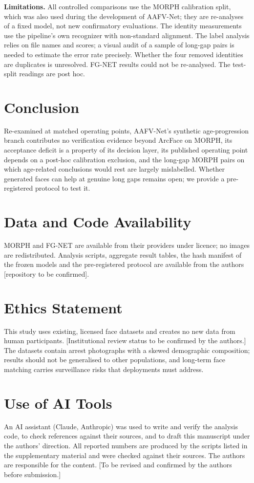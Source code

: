 \documentclass[journal]{IEEEtran}
\begin{document}
\textbf{Limitations.} All controlled comparisons use the MORPH calibration split, which was also used during the development of AAFV-Net; they are re-analyses of a fixed model, not new confirmatory evaluations. The identity measurements use the pipeline's own recognizer with non-standard alignment. The label analysis relies on file names and scores; a visual audit of a sample of long-gap pairs is needed to estimate the error rate precisely. Whether the four removed identities are duplicates is unresolved. FG-NET results could not be re-analysed. The test-split readings are post hoc.

\section{Conclusion}
Re-examined at matched operating points, AAFV-Net's synthetic age-progression branch contributes no verification evidence beyond ArcFace on MORPH, its acceptance deficit is a property of its decision layer, its published operating point depends on a post-hoc calibration exclusion, and the long-gap MORPH pairs on which age-related conclusions would rest are largely mislabelled. Whether generated faces can help at genuine long gaps remains open; we provide a pre-registered protocol to test it.

\section*{Data and Code Availability}
MORPH and FG-NET are available from their providers under licence; no images are redistributed. Analysis scripts, aggregate result tables, the hash manifest of the frozen models and the pre-registered protocol are available from the authors [repository to be confirmed].

\section*{Ethics Statement}
This study uses existing, licensed face datasets and creates no new data from human participants. [Institutional review status to be confirmed by the authors.] The datasets contain arrest photographs with a skewed demographic composition; results should not be generalised to other populations, and long-term face matching carries surveillance risks that deployments must address.

\section*{Use of AI Tools}
An AI assistant (Claude, Anthropic) was used to write and verify the analysis code, to check references against their sources, and to draft this manuscript under the authors' direction. All reported numbers are produced by the scripts listed in the supplementary material and were checked against their sources. The authors are responsible for the content. [To be revised and confirmed by the authors before submission.]



\end{document}
